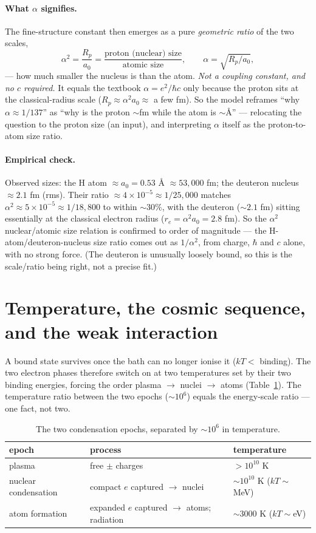 \documentclass[11pt]{article}
\begin{document}
\paragraph{What $\alpha$ signifies.} The fine-structure constant then emerges as a pure \emph{geometric
ratio} of the two scales,
\[ \alpha^2 = \frac{R_p}{a_0} = \frac{\text{proton (nuclear) size}}{\text{atomic size}}, \qquad
\alpha = \sqrt{R_p/a_0}, \]
--- how much smaller the nucleus is than the atom. \emph{Not a coupling constant, and no $c$ required.} It
equals the textbook $\alpha=e^2/\hbar c$ only because the proton sits at the classical-radius scale
($R_p\approx\alpha^2 a_0\approx$ a few fm). So the model reframes ``why $\alpha\approx1/137$'' as ``why is
the proton ${\sim}$fm while the atom is ${\sim}$\AA{}'' --- relocating the question to the proton size (an
input), and interpreting $\alpha$ itself as the proton-to-atom size ratio.

\paragraph{Empirical check.} Observed sizes: the H atom $\approx a_0=0.53$ \AA{} $\approx 53{,}000$ fm; the
deuteron nucleus $\approx 2.1$ fm (rms). Their ratio $\approx 4\times10^{-5}\approx 1/25{,}000$ matches
$\alpha^2\approx 5\times10^{-5}\approx1/18{,}800$ to within ${\sim}30\%$, with the deuteron (${\sim}2.1$ fm)
sitting essentially at the classical electron radius ($r_e=\alpha^2 a_0=2.8$ fm). So the $\alpha^2$
nuclear/atomic size relation is confirmed to order of magnitude --- the H-atom/deuteron-nucleus size ratio
comes out as $1/\alpha^2$, from charge, $\hbar$ and $c$ alone, with no strong force. (The deuteron is
unusually loosely bound, so this is the scale/ratio being right, not a precise fit.)

\section{Temperature, the cosmic sequence, and the weak interaction}\label{sec:temp}
A bound state survives once the bath can no longer ionise it ($kT<$ binding). The two electron phases
therefore switch on at two temperatures set by their two binding energies, forcing the order
plasma $\to$ nuclei $\to$ atoms (Table~\ref{tab:epochs}). The temperature ratio between the two epochs
(${\sim}10^6$) equals the energy-scale ratio --- one fact, not two.

\begin{table}[h]
\centering
\begin{tabular}{lll}
\toprule
epoch & process & temperature \\
\midrule
plasma & free $\pm$ charges & $>10^{10}$ K \\
nuclear condensation & compact $e$ captured $\to$ nuclei & ${\sim}10^{10}$ K ($kT{\sim}$MeV) \\
atom formation & expanded $e$ captured $\to$ atoms; radiation & ${\sim}3000$ K ($kT{\sim}$eV) \\
\bottomrule
\end{tabular}
\caption{The two condensation epochs, separated by ${\sim}10^6$ in temperature.}
\label{tab:epochs}
\end{table}
\end{document}

